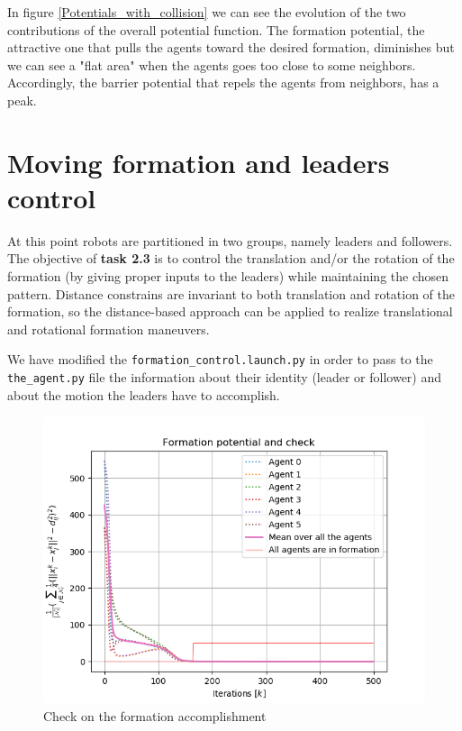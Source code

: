 \documentclass[a4paper,11pt,oneside]{book}
\begin{document}
In figure \ref{Potentials_with_collision} we can see the evolution of the two contributions of the overall potential function. The formation potential, the attractive one that pulls the agents toward the desired formation, diminishes but we can see a "flat area" when the agents goes too close to some neighbors. Accordingly, the barrier potential that repels the agents from neighbors, has a peak.

\section{Moving formation and leaders control}
At this point robots are partitioned in two groups, namely leaders and followers. The objective of \textbf{task 2.3} is to control the translation and/or the rotation of the formation (by giving proper inputs to the leaders) while maintaining the chosen pattern.
Distance constrains  are invariant to both translation and rotation of the formation, so the distance-based approach can be applied to realize translational and rotational formation maneuvers. 

We have modified the \texttt{formation\_control.launch.py} in order to pass to the \texttt{the\_agent.py} file the information about their identity (leader or follower) and about the motion the leaders have to accomplish.

\begin{figure}[h]
\centering
	\includegraphics[scale=0.6]{Task-2.3_Formation-p_Linear-trj_Hexagon}
	\caption{Check on the formation accomplishment}
	\label{Check}
\end{figure}
\end{document}

